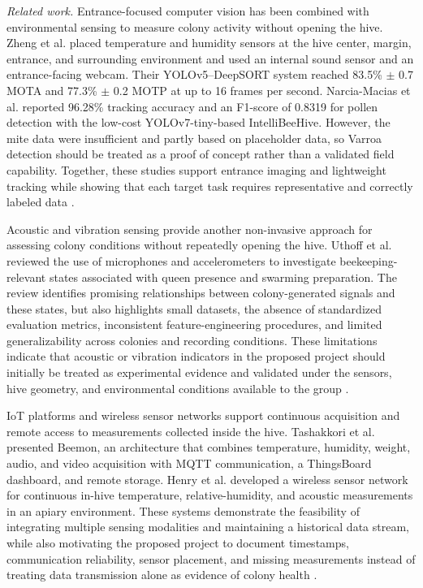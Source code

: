 \documentclass[english,hidelinks]{sbrt}
\begin{document}
\textit{Related work.} Entrance-focused computer vision has been combined with environmental sensing to measure colony activity without opening the hive. Zheng et al. placed temperature and humidity sensors at the hive center, margin, entrance, and surrounding environment and used an internal sound sensor and an entrance-facing webcam. Their YOLOv5--DeepSORT system reached 83.5\% $\pm$ 0.7 MOTA and 77.3\% $\pm$ 0.2 MOTP at up to 16 frames per second. Narcia-Macias et al. reported 96.28\% tracking accuracy and an F1-score of 0.8319 for pollen detection with the low-cost YOLOv7-tiny-based IntelliBeeHive. However, the mite data were insufficient and partly based on placeholder data, so Varroa detection should be treated as a proof of concept rather than a validated field capability. Together, these studies support entrance imaging and lightweight tracking while showing that each target task requires representative and correctly labeled data \cite{zheng2024intelligent,narciamacias2024intellibeehive}.

Acoustic and vibration sensing provide another non-invasive approach for assessing colony conditions without repeatedly opening the hive. Uthoff et al. reviewed the use of microphones and accelerometers to investigate beekeeping-relevant states associated with queen presence and swarming preparation. The review identifies promising relationships between colony-generated signals and these states, but also highlights small datasets, the absence of standardized evaluation metrics, inconsistent feature-engineering procedures, and limited generalizability across colonies and recording conditions. These limitations indicate that acoustic or vibration indicators in the proposed project should initially be treated as experimental evidence and validated under the sensors, hive geometry, and environmental conditions available to the group \cite{uthoff2023acoustic}.

IoT platforms and wireless sensor networks support continuous acquisition and remote access to measurements collected inside the hive. Tashakkori et al. presented Beemon, an architecture that combines temperature, humidity, weight, audio, and video acquisition with MQTT communication, a ThingsBoard dashboard, and remote storage. Henry et al. developed a wireless sensor network for continuous in-hive temperature, relative-humidity, and acoustic measurements in an apiary environment. These systems demonstrate the feasibility of integrating multiple sensing modalities and maintaining a historical data stream, while also motivating the proposed project to document timestamps, communication reliability, sensor placement, and missing measurements instead of treating data transmission alone as evidence of colony health \cite{tashakkori2021beemon,henry2019precision}.
\end{document}
